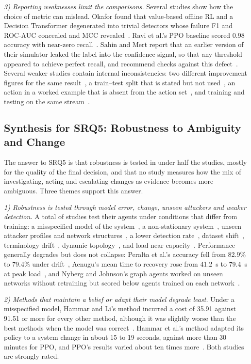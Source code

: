 \emph{3) Reporting weaknesses limit the comparisons.} Several studies show how the choice of metric can mislead. Okafor found that value-based offline RL and a Decision Transformer degenerated into trivial detectors whose failure F1 and ROC-AUC concealed and MCC revealed~\cite{okafor2026}. Ravi et al.'s PPO baseline scored 0.98 accuracy with near-zero recall~\cite{ravi2025}. Sahin and Mert report that an earlier version of their simulator leaked the label into the confidence signal, so that any threshold appeared to achieve perfect recall, and recommend checks against this defect~\cite{sahin2026}. Several weaker studies contain internal inconsistencies: two different improvement figures for the same result~\cite{koupaei2026,varsha2025}, a train--test split that is stated but not used~\cite{bhosale2026}, an action in a worked example that is absent from the action set~\cite{jaber2025}, and training and testing on the same stream~\cite{alturkistani2022}.

\subsection{Synthesis for SRQ5: Robustness to Ambiguity and Change}

The answer to SRQ5 is that robustness is tested in under half the studies, mostly for the quality of the final decision, and that no study measures how the mix of investigating, acting and escalating changes as evidence becomes more ambiguous. Three themes support this answer.

\emph{1) Robustness is tested through model error, change, unseen attackers and weaker detection.} A total of \NRobust{} studies test their agents under conditions that differ from training: a misspecified model of the system~\cite{hammar2025}, a non-stationary system~\cite{hammar2026belief}, unseen attacker profiles and network structures~\cite{ravi2025,nyberg2024,castro2025}, a lower detection rate~\cite{contractor2025}, dataset shift~\cite{sahin2026}, terminology drift~\cite{peralta2025}, dynamic topology~\cite{wu2026}, and load near capacity~\cite{aenugu2026,kovtun2026}. Performance generally degrades but does not collapse: Peralta et al.'s accuracy fell from 82.9\% to 79.4\% under drift~\cite{peralta2025}, Aenugu's mean time to recovery rose from 41.2~s to 79.4~s at peak load~\cite{aenugu2026}, and Nyberg and Johnson's graph agents worked on unseen networks without retraining but scored below agents trained on each network~\cite{nyberg2024}.

\emph{2) Methods that maintain a belief or adapt their model degrade least.} Under a misspecified model, Hammar and Li's method incurred a cost of 35.91 against 91.51 or more for every other method, although it was slightly worse than the best methods when the model was correct~\cite{hammar2025}. Hammar et al.'s method adapted its policy to a system change in about 15 to 19 seconds, against more than 30 minutes for PPO, and PPO's results varied about ten times more~\cite{hammar2026belief}. Both studies are strongly rated.

